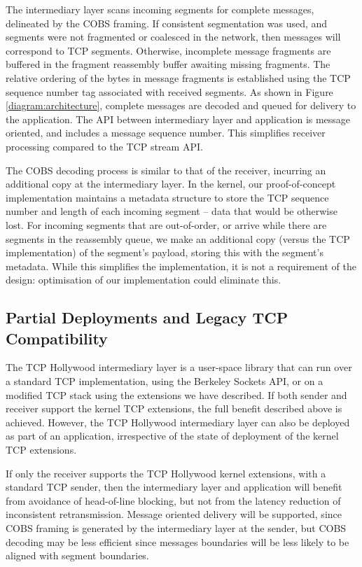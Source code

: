 The intermediary layer scans incoming segments for complete messages,
delineated by the COBS framing. If consistent segmentation was used, and
segments were not fragmented or coalesced in the network, then messages
will correspond to TCP segments. Otherwise, incomplete message fragments
are buffered in the fragment reassembly buffer awaiting missing fragments.
The relative ordering of the bytes in message fragments is established
using the TCP sequence number tag associated with received segments.
As shown in Figure \ref{diagram:architecture}, complete messages are
decoded and queued for delivery to the application. The API between
intermediary layer and application is message oriented, and includes a
message sequence number. This simplifies receiver processing compared to
the TCP stream API.

The COBS decoding process is similar to that of the receiver, incurring an
additional copy at the intermediary layer. In the kernel, our
proof-of-concept implementation maintains a metadata structure to store the
TCP sequence number and length of each incoming segment -- data that would
be otherwise lost. For incoming segments that are out-of-order, or arrive
while there are segments in the reassembly queue, we make an additional
copy (versus the TCP implementation) of the segment's payload, storing this
with the segment's metadata. While this simplifies the implementation, it
is not a requirement of the design: optimisation of our implementation
could eliminate this.

\subsection{Partial Deployments and Legacy TCP Compatibility}
\label{subsec:partialdep}

The TCP Hollywood intermediary layer is a user-space library that can run
over a standard TCP implementation, using the Berkeley Sockets API, or on
a modified TCP stack using the extensions we have described. If both
sender and receiver support the kernel TCP extensions, the full
benefit described above is achieved. However, the TCP Hollywood
intermediary layer can also be deployed as part of an application,
irrespective of the state of deployment of the kernel TCP extensions.

If only the receiver supports the TCP Hollywood kernel extensions, with
a standard TCP sender, then the intermediary layer and application will
benefit from avoidance of head-of-line blocking, but not from the latency
reduction of inconsistent retransmission.
Message oriented delivery will be supported, since COBS framing is
generated by the intermediary layer at the sender, but COBS decoding may
be less efficient since messages boundaries will be less likely to be
aligned with segment boundaries.

